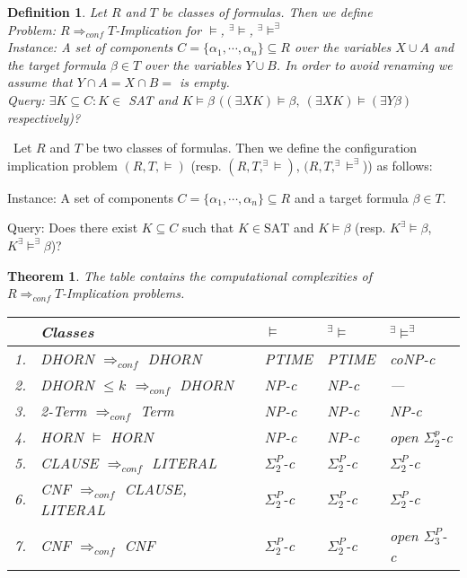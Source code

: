\documentclass[12pt]{article}
\newcommand{\AM}{\mbox{$^\exists\!\!\models$}}
\newcommand{\AMB}{\mbox{$^\exists\!\!\models^\exists$}}
\newtheorem{definition}{Definition}[section]
\newtheorem{theorem}{Theorem}[section]
\begin{document}
\begin{definition}
 Let $R$ and $T$ be classes of formulas. Then we define\\
{\em Problem:  $R \Longrightarrow_{conf} T$-Implication for $\models$, \AM, \AMB}\\
{\em Instance}: A set of components $C=\{\alpha_1,\cdots,\alpha_n\} \subseteq R$ over the variables $X \cup A$ and the target formula $\beta \in T$ over the variables $Y \cup B$. In order to avoid renaming we assume that $Y \cap A= X \cap B=$ is empty.\\
{\em Query}:
 $ \exists K \subseteq C: K \in$ SAT and $K \models \beta$ $((\exists X K)  \models \beta, \
(\exists X K) \models (\exists Y \beta)$ respectively)?\\
\end{definition}

\color{red}
\ Let $R$ and $T$ be two classes of formulas. Then we define the configuration implication problem
$(R, T, \models)$ (resp. $(R, T, ^\exists\!\models)$, $(R, T,^\exists\!\models^\exists$)) as follows:

\begin{description}
\item {Instance:} A set of components $C=\{\alpha_1,\cdots, \alpha_n\}\subseteq R$ and a target formula $\beta\in T$.
\item {Query:} Does there exist $K\subseteq C$ such that $K\in \mbox{SAT}$ and $K\models \beta$ (resp. $K^\exists\!\!\models \beta$, $K
^\exists\!\!\models^\exists\beta$)?
\end{description} 
\color{black}


\begin{theorem}
The table contains the computational complexities of\\ $R \Longrightarrow_{conf} T$-Implication problems.\\
\begin{tabular}{|l|l|l|l|l|}
\hline
 & {\em Classes} &  $\models$ & \AM & \AMB \\ \hline
1. & DHORN $\Rightarrow_{conf}$ DHORN          & PTIME & PTIME  & coNP-c         \\ \hline
2. & DHORN $\leq k$ $\Rightarrow_{conf}$ DHORN & NP-c  & NP-c   & ---         \\ \hline
3. & 2-Term $\Rightarrow_{conf}$ Term          & NP-c  & NP-c   & NP-c           \\ \hline
4. & HORN $\models$ HORN                       & NP-c  & NP-c   & open $\Sigma^p_2$-c \\ \hline
5. & CLAUSE $\Rightarrow_{conf}$ LITERAL       & $\Sigma_2^P$-c & $\Sigma_2^P$-c & $\Sigma_2^P$-c \\ \hline
6. & CNF $\Rightarrow_{conf}$ CLAUSE, LITERAL  & $\Sigma_2^P$-c & $\Sigma_2^P$-c & $\Sigma_2^P$-c \\ \hline
7. & CNF $\Rightarrow_{conf}$ CNF              & $\Sigma_2^P$-c & $\Sigma_2^P$-c & open $\Sigma_3^P$-c \\ \hline
\end{tabular}
\end{theorem}
\end{document}
